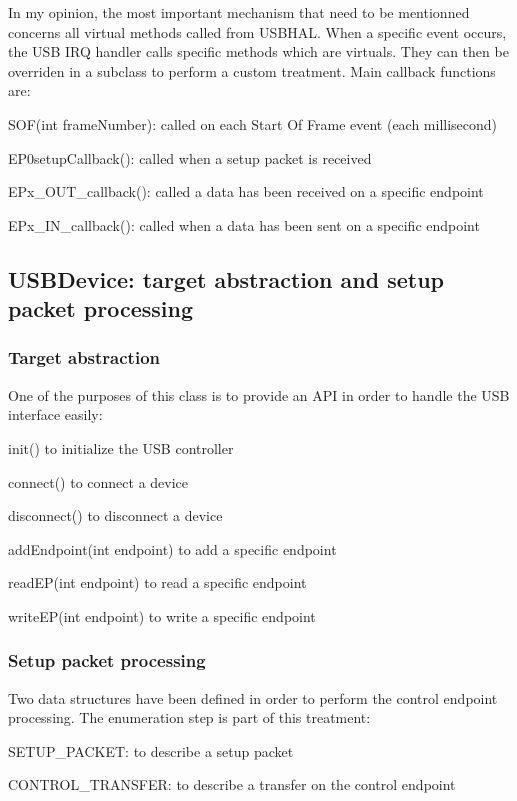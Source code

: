 \documentclass[pdftex,10pt,a4paper]{report}
\newenvironment{packed_item}{
\begin{itemize}
  \setlength{\itemsep}{1pt}
  \setlength{\parskip}{0pt}
  \setlength{\parsep}{0pt}
}{\end{itemize}}
\begin{document}
In my opinion, the most important mechanism that need to be mentionned concerns all virtual methods called from USBHAL. When a specific event occurs, the USB IRQ handler calls specific methods which are virtuals. They can then be overriden in a subclass to perform a custom treatment. Main callback functions are:
\begin{packed_item}
	\item SOF(int frameNumber): called on each Start Of Frame event (each millisecond)
	\item EP0setupCallback(): called when a setup packet is received
	\item EPx\_OUT\_callback(): called a data has been received on a specific endpoint
	\item EPx\_IN\_callback(): called when a data has been sent on a specific endpoint
\end{packed_item}


\subsection{USBDevice: target abstraction and setup packet processing}
\subsubsection{Target abstraction}
One of the purposes of this class is to provide an API in order to handle the USB interface easily:
\begin{packed_item}
	\item init() to initialize the USB controller
	\item connect() to connect a device
	\item disconnect() to disconnect a device
	\item addEndpoint(int endpoint) to add a specific endpoint
	\item readEP(int endpoint) to read a specific endpoint
	\item writeEP(int endpoint) to write a specific endpoint 
\end{packed_item}

\subsubsection{Setup packet processing}
Two data structures have been defined in order to perform the control endpoint processing. The enumeration step is part of this treatment:
\begin{packed_item}
	\item SETUP\_PACKET: to describe a setup packet
	\item CONTROL\_TRANSFER: to describe a transfer on the control endpoint
\end{packed_item}
\end{document}
